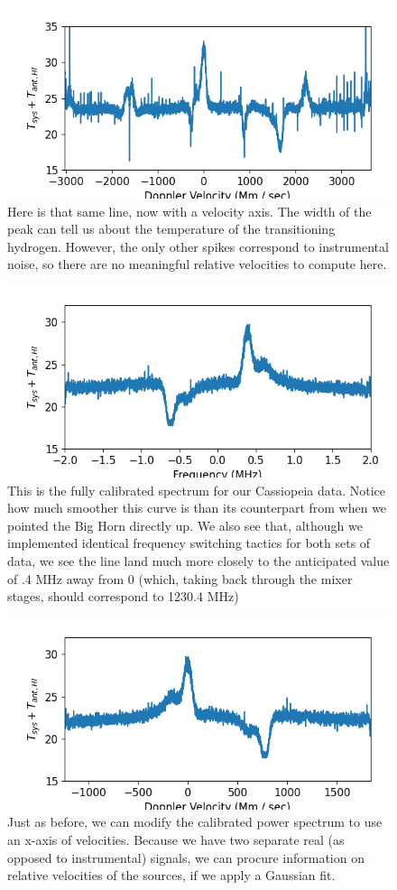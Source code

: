 \documentclass[12pt]{article}
\begin{document}
\begin{figure}
	\centering
	\includegraphics[width=.6\linewidth]{up_vs_vel}
	\caption{Here is that same line, now with a velocity axis. The width of the peak can tell us about the temperature of the transitioning hydrogen. However, the only other spikes correspond to instrumental noise, so there are no meaningful relative velocities to compute here.}
	\label{fig:up_vs_vel}
\end{figure}

\begin{figure}
\centering
	\includegraphics[width=.6\linewidth]{cass_vs_frq}
	\caption{This is the fully calibrated spectrum for our Cassiopeia data. Notice how much smoother this curve is than its counterpart from when we pointed the Big Horn directly up. We also see that, although we implemented identical frequency switching tactics for both sets of data, we see the line land much more closely to the anticipated value of .4 MHz away from 0 (which, taking back through the mixer stages, should correspond to 1230.4 MHz)}
	\label{fig:cass_vs_freq}
\end{figure}

\begin{figure}
	\centering
	\includegraphics[width=.6\linewidth]{cass_vs_vel}
	\caption{Just as before, we can modify the calibrated power spectrum to use an x-axis of velocities. Because we have two separate real (as opposed to instrumental) signals, we can procure information on relative velocities of the sources, if we apply a Gaussian fit.}
	\label{fig:cass_vs_vel}
\end{figure}
\end{document}
